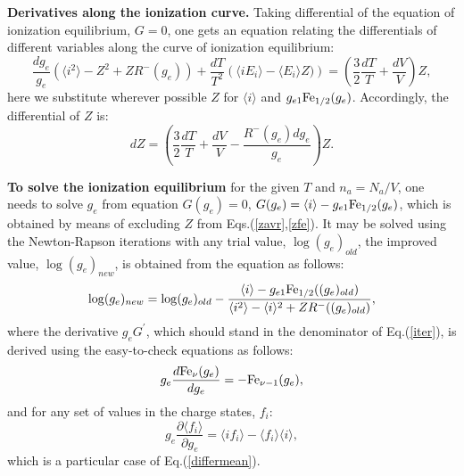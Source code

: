 {\bf Derivatives along the ionization curve.}
Taking differential of the equation of ionization equilibrium, $G=0$, one gets an equation relating the differentials
of different variables along the curve of ionization equilibrium:
\begin{equation}\label{diffge}
\frac{dg_e}
{g_e}
\left(
\langle i^2\rangle-Z^2+ZR^-(g_e)
\right)+\frac{dT}{T^2}
\left(\langle iE_i\rangle-\langle E_i\rangle Z)\right)=\left(\frac32\frac{dT}{T}+\frac{dV}V\right)Z,
\end{equation}
here we substitute wherever possible $Z$ for $\langle i\rangle$ and $g_{e1}{\rm Fe}_{1/2}(g_e)$.
Accordingly, the differential of $Z$ is:
\begin{equation}\label{diffz}
dZ=\left(\frac32\frac{dT}{T}+\frac{dV}V-\frac{R^-(g_e)dg_e}{g_e}\right)Z.
\end{equation}

{\bf To solve the ionization equilibrium} for the given $T$ and $n_a=N_a/V$, one needs to solve $g_e$ from equation $G(g_e)=0$, 
$G(g_e)=\langle i\rangle-g_{e1}{\rm Fe}_{1/2}(g_e)$, which is obtained by means of excluding $Z$ from Eqs.(\ref{zavr},\ref{zfe}). 
It may be solved using the Newton-Rapson iterations with any trial value, $\log(g_e)_{old}$, the improved value, $\log(g_e)_{new}$, 
is obtained from the equation as follows:
\begin{equation}\label{iter}
\log(g_e)_{new}=%
\log(g_e)_{old}-\frac{\langle i\rangle-g_{e1}{\rm Fe}_{1/2}((g_e)_{old})}{
\langle i^2\rangle-\langle i\rangle^2+ Z R^-((g_e)_{old}) },
\end{equation}
where the derivative $g_eG^\prime$, which should stand in the denominator of 
Eq.(\ref{iter}), is derived using the easy-to-check equations as follows:
\begin{equation}
g_e\frac{d{\rm Fe}_\nu(g_e)}{dg_e}=-{\rm Fe}_{\nu-1}(g_e),
\end{equation}
and for any set of values in the charge states, $f_i$:
\begin{equation}
g_e\frac{\partial\langle f_i\rangle}{\partial g_e}=\langle if_i\rangle-\langle f_i\rangle\langle i\rangle,
\end{equation}
which is a particular case of Eq.(\ref{differmean}).

